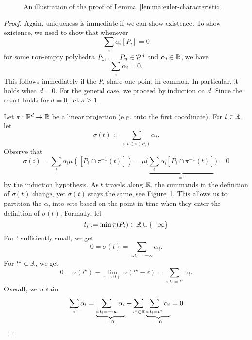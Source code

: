 \begin{figure}
  \begin{center}
  \end{center}
  \caption{An illustration of the proof of Lemma~\ref{lemma:euler-characteristic}.}
  \label{fig:proof-euler-characteristic}
\end{figure}
\begin{proof}
  Again, uniqueness is immediate if we can show existence.
  To show existence, we need to show that whenever
  \[
    \sum_i \alpha_i [P_i] = 0
  \]
  for some non-empty polyhedra $P_1, \ldots, P_n \in \mathcal{P}^d$ and $\alpha_i \in \mathbb{R}$,
  we have
  \[
    \sum_i \alpha_i = 0.
  \]
  This follows immediately if the $P_i$ share one point in common.
  In particular, it holds when $d = 0$.
  For the general case, we proceed by induction on $d$.
  Since the result holds for $d = 0$, let $d \geq 1$.

  Let $\pi : \mathbb{R}^d \to \mathbb{R}$ be a linear projection (e.g. onto the first coordinate).
  For $t \in \mathbb{R}$, let
  \[
    \sigma(t) := \sum_{i : t \in \pi(P_i)} \alpha_i.
  \]
  Observe that
  \[
    \sigma(t) = \sum_i \alpha_i \mu([P_i \cap \pi^{-1}(t)])
      = \mu\big( \underbrace{\sum_i \alpha_i [P_i \cap \pi^{-1}(t)]}_{=0} \big)
      = 0
  \]
  by the induction hypothesis.
  As $t$ travels along $\mathbb{R}$,
  the summands in the definition of $\sigma(t)$ change,
  yet $\sigma(t)$ stays the same, see Figure~\ref{fig:proof-euler-characteristic}.
  This allows us to partition the $\alpha_i$ into sets based on the point in time when they enter the definition of $\sigma(t)$.
  Formally, let
  \[
     t_i := \min\pi(P_i) \in \mathbb{R} \cup \{ -\infty \}
  \]
  For $t$ sufficiently small,
  we get
  \[
    0 = \sigma(t) = \sum_{i : t_i = -\infty} \alpha_i.
  \]
  For $t^\star \in \mathbb{R}$, we get
  \[
    0 = \sigma(t^\star) - \lim_{\varepsilon \to 0+} \sigma(t^\star - \varepsilon) = \sum_{i: t_i = t^\star} \alpha_i.
  \]
  Overall, we obtain
  \[
    \sum_i \alpha_i = \underbrace{\sum_{i : t_i = -\infty} \alpha_i}_{=0} + \sum_{t^\star \in \mathbb{R}} \underbrace{\sum_{i: t_i = t^\star} \alpha_i}_{=0} = 0 \qedhere
  \]
\end{proof}



